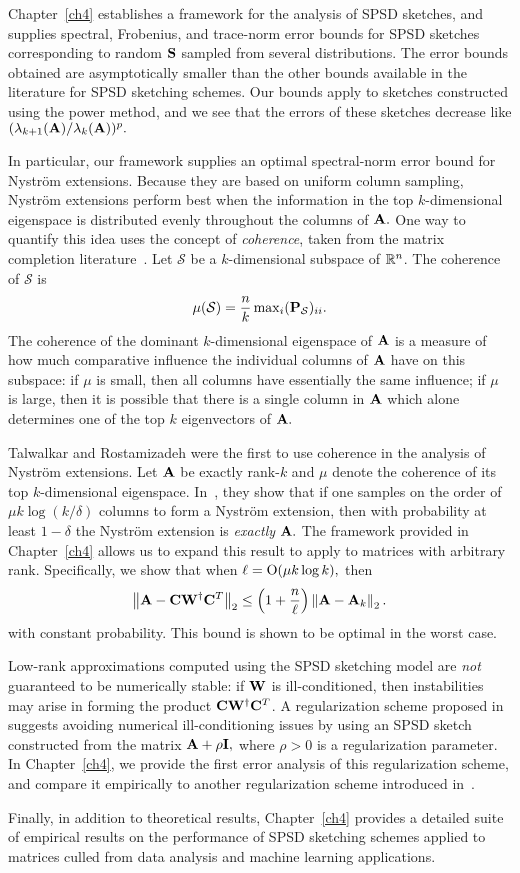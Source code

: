 Chapter~\ref{ch4} establishes a framework for the analysis of SPSD sketches, 
and supplies spectral, Frobenius, and trace-norm error bounds for SPSD
sketches corresponding to random $\mathbf{S}$ sampled from several distributions.
The error bounds obtained are asymptotically smaller than the other bounds
available in the literature for SPSD sketching schemes. Our bounds
apply to sketches constructed using the power method, and we see that 
the errors of these sketches decrease like $(\lambda_{k+1}(\mathbf{A})/\lambda_k(\mathbf{A}))^p.$

In particular, our framework supplies an optimal spectral-norm error bound 
for Nystr\"om extensions.
Because they are based on uniform column sampling, Nystr\"om extensions perform
best when the information in the top $k$-dimensional eigenspace is distributed
evenly throughout the columns of $\mathbf{A}.$ One way to quantify this idea 
uses the concept of \emph{coherence}, taken from the matrix completion 
literature~\cite{CR09}. Let $\mathcal{S}$ be a $k$-dimensional subspace of 
$\mathbb{R}^n$. The coherence of $\mathcal{S}$ is
\[
 \mu(\mathcal{S}) = \frac{n}{k} \max\nolimits_i (\mathbf{P}_{\mathcal{S}})_{ii}.
\]
The coherence of the dominant $k$-dimensional eigenspace of $\mathbf{A}$ is a 
measure of how much comparative influence the individual columns of 
$\mathbf{A}$ have on this subspace: if $\mu$ is small, then all columns have 
essentially the same influence; if $\mu$ is large, then it is possible that 
there is a single column in $\mathbf{A}$ which alone determines one of the top 
$k$ eigenvectors of $\mathbf{A}.$ 

Talwalkar and Rostamizadeh were the first to use coherence in the analysis of 
Nystr\"om extensions. Let $\mathbf{A}$ be exactly rank-$k$ and $\mu$ denote the
coherence of its top $k$-dimensional eigenspace. In~\cite{RT10}, they show 
that if one samples on the order of $\mu k \log(k/\delta)$ columns to form a 
Nystr\"om extension, then with probability at least $1-\delta$ the Nystr\"om
extension is \emph{exactly} $\mathbf{A}.$ The framework provided in Chapter~\ref{ch4} allows us to expand this 
result to apply to matrices with arbitrary rank. Specifically, we show that
when $\ell = \mathrm{O}(\mu k \log k),$ then
\[
 \left\|\mathbf{A} - \mathbf{C} \mathbf{W}^\dagger \mathbf{C}^T\right\|_2 \leq  
 \left(1 + \frac{n}{\ell} \right) \left\|\mathbf{A} - \mathbf{A}_k\right\|_2.
\]
with constant probability. This bound is shown to be optimal in the worst case.

Low-rank approximations computed using the SPSD sketching model are
\emph{not} guaranteed to be numerically stable: if $\mathbf{W}$ is 
ill-conditioned, then instabilities may arise in forming the product 
$\mathbf{C} \mathbf{W}^\dagger \mathbf{C}^T$. A regularization scheme proposed in~\cite{WS01}
suggests avoiding numerical ill-conditioning issues by using an SPSD
sketch constructed from the matrix $\mathbf{A} + \rho \mathbf{I},$ where $\rho > 0$
is a regularization parameter. In Chapter~\ref{ch4}, we provide the first
error analysis of this regularization scheme, and compare it empirically
to another regularization scheme introduced in~\cite{CD11}.

Finally, in addition to theoretical results, Chapter~\ref{ch4} provides a detailed
suite of empirical results on the performance of SPSD sketching schemes
applied to matrices culled from data analysis and machine learning applications.

